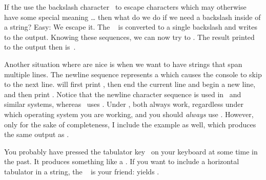 If the use the backslash character~\inQuotes{\textbackslash}\pythonIdx{\textbackslash} to escape characters which may otherwise have some special meaning {\dots} then what do we do if we need a backslash inside of a string?
Easy: We escape it.
The ~\inQuotes{\textbackslash\textbackslash}\pythonIdx{\textbackslash\textbackslash} is converted to a single backslash and \expandafter{} writes \textil{\\} to the output.
Knowing these sequences, we can now try to .
The result printed to the output then is~.

Another situation where  are nice is when we want to have strings that span multiple lines.
The newline sequence  represents a  which causes the console to skip to the next line.
 will first print , then end the current line and begin a new line, and then print .
Notice that the newline character sequence  is used in \linux\ and similar systems, whereas \microsoftWindows\ uses .
Under \python, both always work, regardless under which operating system you are working, and you should \emph{always} use .
However, only for the sake of completeness, I include the example  as well, which produces the same output as .

You probably have pressed the tabulator key~\keys{\tab} on your keyboard at some time in the past.
It produces something like a .
If you want to include a horizontal tabulator in a string, the ~ is your friend:
 yields .


